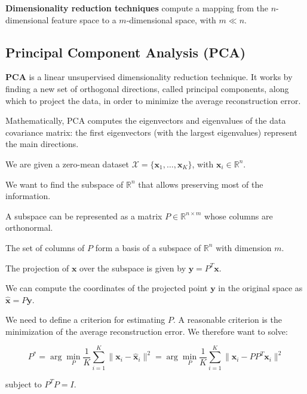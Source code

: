 \setlength{\parindent}{0pt}  %
\setlength{\parskip}{0.7em}  %


\textbf{Dimensionality reduction techniques} compute a mapping from the $n$-dimensional feature space to a $m$-dimensional space, with $m \ll n$.

\subsection{Principal Component Analysis (PCA)}

\textbf{PCA} is a linear unsupervised dimensionality reduction technique. It works by finding a new set of orthogonal directions, called principal components, along which to project the data, in order to minimize the average reconstruction error.

Mathematically, PCA computes the eigenvectors and eigenvalues of the data covariance matrix: the first eigenvectors (with the largest eigenvalues) represent the main directions.

We are given a zero-mean dataset $\mathcal{X} = \{\mathbf{x}_1, \ldots, \mathbf{x}_K\}$, with $\mathbf{x}_i \in \mathbb{R}^n$.

We want to find the subspace of $\mathbb{R}^n$ that allows preserving most of the information.

A subspace can be represented as a matrix $P \in \mathbb{R}^{n \times m}$ whose columns are orthonormal.

The set of columns of $P$ form a basis of a subspace of $\mathbb{R}^n$ with dimension $m$.

The projection of $\mathbf{x}$ over the subspace is given by $\mathbf{y} = P^T\mathbf{x}$.

We can compute the coordinates of the projected point $\mathbf{y}$ in the original space as $\hat{\mathbf{x}} = P\mathbf{y}$.

We need to define a criterion for estimating $P$. A reasonable criterion is the minimization of the average reconstruction error. We therefore want to solve:

\begin{equation*}
P^* = \arg\min_P \frac{1}{K} \sum_{i=1}^{K} \|\mathbf{x}_i - \hat{\mathbf{x}}_i\|^2 = \arg\min_P \frac{1}{K} \sum_{i=1}^{K} \|\mathbf{x}_i - PP^T\mathbf{x}_i\|^2
\end{equation*}

subject to $P^TP = I$.

